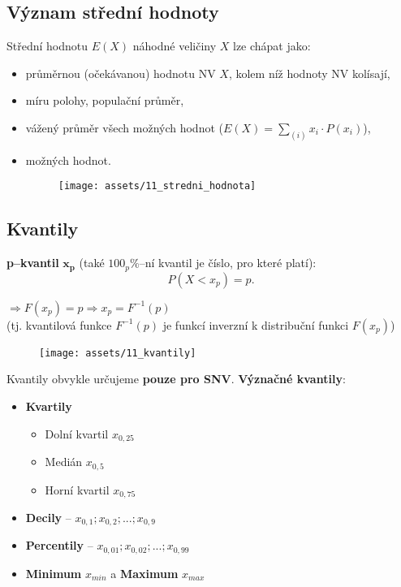\subsection{Význam střední hodnoty}
Střední hodnotu $E(X)$ náhodné veličiny $X$ lze chápat jako:
\begin{itemize}
    \item průměrnou (očekávanou) hodnotu NV $X$, kolem níž hodnoty NV kolísají,
    \item míru polohy, populační průměr,
    \item vážený průměr všech možných hodnot ($E(X) = \sum_{(i)}x_i \cdot P(x_i)$),
    \item {} možných hodnot.
          \begin{figure}[H]
              \centering
              \texttt{[image: assets/11\_stredni\_hodnota]}
          \end{figure}
\end{itemize}

\subsection{Kvantily}
\textbf{p--kvantil} $\mathbf{x_p}$ (také $100_p\%$--ní kvantil je číslo, pro které platí): $$P(X < x_p) = p.$$
\begin{center}
    $\Rightarrow F(x_p) = p \Rightarrow x_p = F^{-1}(p)$ \\
    (tj. kvantilová funkce $F^{-1}(p)$ je funkcí inverzní k distribuční funkci $F(x_p)$)
    \begin{figure}[H]
        \centering
        \texttt{[image: assets/11\_kvantily]}
    \end{figure}
\end{center}

\noindent Kvantily obvykle určujeme \textbf{pouze pro SNV}. \textbf{Význačné kvantily}:
\begin{itemize}
    \item \textbf{Kvartily}
          \begin{itemize}
              \item[] Dolní kvartil $x_{0,25}$
              \item[] Medián $x_{0,5}$
              \item[] Horní kvartil $x_{0,75}$
          \end{itemize}
    \item \textbf{Decily} -- $x_{0,1}; x_{0,2}; ... ;x_{0,9}$
    \item \textbf{Percentily} -- $x_{0,01}; x_{0,02}; ... ;x_{0,99}$
    \item \textbf{Minimum} $x_{min}$ a \textbf{Maximum} $x_{max}$
\end{itemize}

